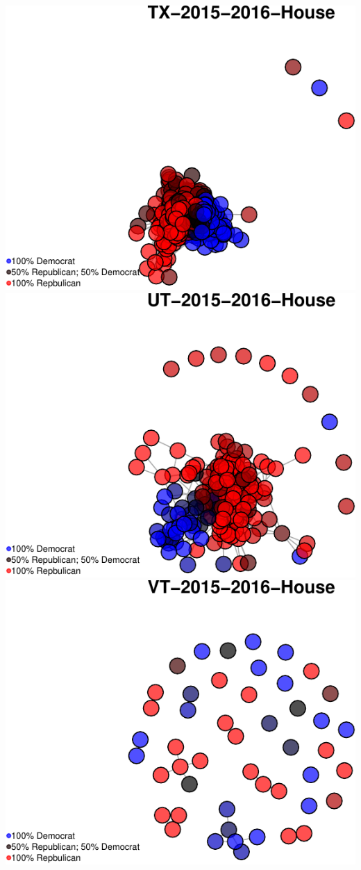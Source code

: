 \documentclass[]{article}
\begin{document}
\includegraphics{Final_Project_RMarkdown_Updated_files/figure-latex/unnamed-chunk-10-37.pdf}
\includegraphics{Final_Project_RMarkdown_Updated_files/figure-latex/unnamed-chunk-10-38.pdf}
\includegraphics{Final_Project_RMarkdown_Updated_files/figure-latex/unnamed-chunk-10-39.pdf}
\end{document}

